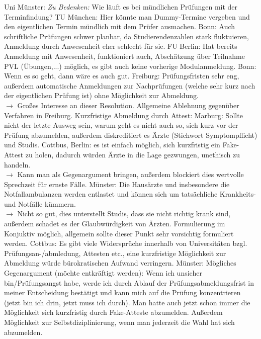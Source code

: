 \begin{outline}
        \1 Uni Münster: \textit{Zu Bedenken:} Wie läuft es bei mündlichen Prüfungen mit der Terminfindung?
          \2 TU München: Hier könnte man Dummy-Termine vergeben und den eigentlichen Termin mündlich mit dem Prüfer ausmachen.
        \1 Bonn: Auch schriftliche Prüfungen schwer planbar, da Studierendenzahlen stark fluktuieren, Anmeldung durch Anwesenheit eher schlecht für sie.
          \2 FU Berlin: Hat bereits Anmeldung mit Anwesenheit, funktioniert auch, Abschätzung über Teilnahme PVL (Übungen,...) möglich, es gibt auch keine vorherige Modulanmeldung.
          \2 Bonn: Wenn es so geht, dann wäre es auch gut.
        \1 Freiburg: Prüfungsfristen sehr eng, außerdem automatische Anmeldungen zur Nachprüfungen (welche sehr kurz nach der eigentlichen Prüfung ist) ohne Möglichkeit zur Abmeldung. \\
          $\rightarrow$ Großes Interesse an dieser Resolution.
          \2 Allgemeine Ablehnung gegenüber Verfahren in Freiburg.
        \1 Kurzfristige Abmeldung durch Attest:
          \2 Marburg: Sollte nicht der letzte Ausweg sein, warum geht es nicht auch so, sich kurz vor der Prüfung abzumelden, außerdem diskreditiert es Ärzte (Stichwort Symptompflicht) und Studis.
          \2 Cottbus, Berlin: es ist einfach möglich, sich kurzfristig ein Fake-Attest zu holen, dadurch würden Ärzte in die Lage gezwungen, unethisch zu handeln. \\
            $\rightarrow$ Kann man als Gegenargument bringen, außerdem blockiert dies wertvolle Sprechzeit für ernste Fälle.
          \2 Münster: \flqq Die Hausärzte und insbesondere die Notfallambulanzen werden entlastet und können sich um tatsächliche Krankheits- und Notfälle kümmern.\frqq \\
            $\rightarrow$ Nicht so gut, dies unterstellt Studis, dass sie nicht richtig krank sind, außerdem schadet es der Glaubwürdigkeit von Ärzten.
            \3 Formulierung im Konjuktiv möglich, allgemein sollte dieser Punkt sehr vorsichtig formuliert werden.
        \1 Cottbus: Es gibt viele Widersprüche innerhalb von Universitäten bzgl. Prüfungsan-/abmledung, Attesten etc., eine kurzfristige Möglichkeit zur Abmeldung würde bürokratischen Aufwand verringern.
        \1 Münster: Mögliches Gegenargument (möchte entkräftigt werden): Wenn ich unsicher bin/Prüfungsangst habe, werde ich durch Ablauf der Prüfungsabmeldungsfrist in meiner Entscheidung bestätigt und kann mich auf die Prüfung konzentrieren (\flqq jetzt bin ich drin, jetzt muss ich durch\frqq).
        \2 Man hatte auch jetzt schon immer die Möglichkeit sich kurzfristig durch Fake-Atteste abzumelden.
        \2 Außerdem Möglichkeit zur Selbstdiziplinierung, wenn man jederzeit die Wahl hat sich abzumelden.
      \end{outline}

